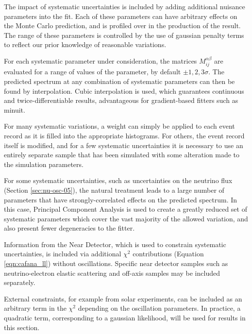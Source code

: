 The impact of systematic uncertainties is included by adding additional nuisance parameters into the fit. Each of these parameters can have arbitrary effects on the Monte Carlo prediction, and is profiled over in the production of the result. The range of these parameters is controlled by the use of gaussian penalty terms to reflect our prior knowledge of reasonable variations.

For each systematic parameter under consideration, the matrices $M_{ij}^{\alpha\beta}$ are evaluated for a range of values of the parameter, by default $\pm1,2,3\sigma$. The predicted spectrum at any combination of systematic parameters can then be found by interpolation. Cubic interpolation is used, which guarantees continuous and twice-differentiable results, advantageous for gradient-based fitters such as {\sc minuit}. %

For many systematic variations, a weight can simply be applied to each event record as it is filled into the appropriate histograms. For others, the event record itself is modified, and for a few systematic uncertainties it is necessary to use an entirely separate sample that has been simulated with some alteration made to the simulation parameters.

For some systematic uncertainties, such as uncertainties on the neutrino flux (Section \ref{sec:nu-osc-05}), the natural treatment leads to a large number of parameters that have strongly-correlated effects on the predicted spectrum. In this case, Principal Component Analysis is used to create a greatly reduced set of systematic parameters which cover the vast majority of the allowed variation, and also present fewer degeneracies to the fitter.

Information from the Near Detector, which is used to constrain systematic uncertainties, is included via additional $\chi^2$ contributions (Equation \ref{eqn:cafana_ll}) without oscillations. Specific near detector samples such as neutrino-electron elastic scattering and off-axis samples may be included separately. %

External constraints, for example from solar experiments, can be included as an arbitrary term in the $\chi^2$ depending on the oscillation parameters. In practice, a quadratic term, corresponding to a gaussian likelihood, will be used for results in this section.

